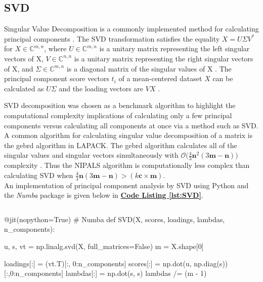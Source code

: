 \documentclass[12pt]{article}
\begin{document}
\subsection{SVD}\label{3.2}
Singular Value Decomposition is a commonly implemented method for calculating principal components \cite{oliphant2009numpy} \cite{scikit-learn}. The SVD transformation satisfies the equality $X=U \Sigma V^*$ for $X \in \mathbb{C}^{m,n}$, where
$ U\in \mathbb{C}^{m,n}$ is a unitary matrix representing the left singular vectors of X, $ V\in \mathbb{C}^{n,n}$ is a unitary matrix representing the right singular vectors of X, and $\Sigma \in \mathbb{C}^{m,n}$ is a diagonal matrix of the singular values of X \cite{trefethen1997numerical}. The principal component score vectors $t_i$ of a mean-centered dataset $X$ can be calculated as $U \Sigma $ and the loading vectors are $VX$ \cite{madsen2004singular}.

SVD decomposition was chosen as a benchmark algorithm to highlight the computational complexity implications of calculating only a few principal components versus calculating all components at once via a method such as SVD. A common algorithm for calculating singular value decomposition of a matrix is the gebrd algorithm in LAPACK. The gebrd algorithm calculates all of the singular values and singular vectors simultaneously with $\mathcal{O}\big( \frac{4}{3}\textbf{n}^2(3\textbf{m} - \textbf{n}) \big)$ complexity \cite{intelmath}. Thus the NIPALS algorithm is computationally less complex than calculating SVD when $\frac{4}{3}\textbf{n}(3\textbf{m} - \textbf{n})>(k\textbf{c}\times\textbf{m})$.  \\ An implementation of principal component analysis by SVD using Python and the \textit{Numba} package \cite{numba} is given below in \textbf{\hyperref[lst:SVD]{Code Listing \ref*{lst:SVD}}}.

\begin{lstlisting}[frame=none,caption={Calculating Principal Components with SVD},captionpos=b,label=lst:SVD]
\end{lstlisting}

\begin{python}
@jit(nopython=True) # Numba
def SVD(X, scores, loadings, lambdas, n_components):

    u, s, vt = np.linalg.svd(X, full_matrices=False)
    m = X.shape[0]

    loadings[:] = (vt.T)[:, 0:n_components]
    scores[:] = np.dot(u, np.diag(s))[:,0:n_components]
    lambdas[:] = np.dot(s, s)
    lambdas /= (m - 1)
\end{python}
\end{document}
